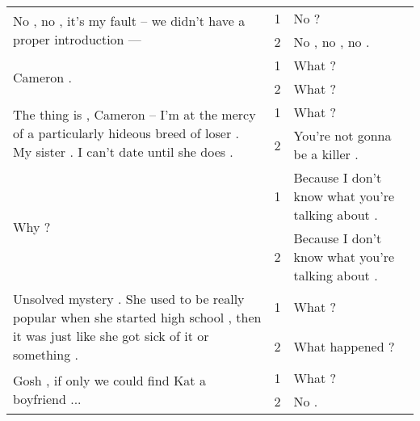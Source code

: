 \begin{table}
\begin{tabular}{p{}|cp{}}
        \hline
        \multirow{2}{.6\textwidth}{No , no , it's my fault -- we didn't have a proper introduction ---} & 1 & No ?\\
        & 2 & No , no , no .\\

        \hline
        \multirow{2}{.6\textwidth}{Cameron .} & 1 &  What ?\\
        & 2 & What ?\\

        \hline
        \multirow{2}{.6\textwidth}{The thing is , Cameron -- I'm at the mercy of a particularly hideous breed of loser . My sister . I can't date until she does .} & 1 & What ?\\
        & 2 & You're not gonna be a killer .\\

        \hline
        \multirow{2}{.6\textwidth}{Why ?} & 1 & Because I don't know what you're talking about .\\
        & 2 & Because I don't know what you're talking about .\\

        \hline
        \multirow{2}{.6\textwidth}{Unsolved mystery . She used to be really popular when she started high school , then it was just like she got sick of it or something .} & 1 &  What ?\\
        & 2 & What happened ?\\

        \hline
        \multirow{2}{.6\textwidth}{Gosh , if only we could find Kat a boyfriend ...} & 1 &  What ?\\
        & 2 & No . \\

        \bottomrule

    \end{tabular}
\end{table}


